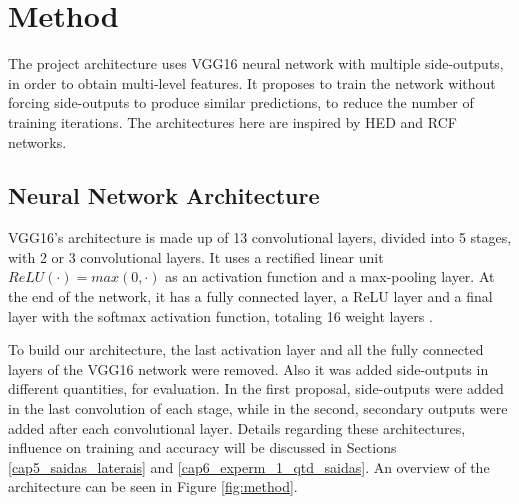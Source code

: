 \section{Method}
\label{cap5_metodologia}

The project architecture uses VGG16 neural network with multiple side-outputs, in order to obtain multi-level features.
It proposes to train the network without forcing side-outputs to produce similar predictions, to reduce the number of training iterations.
The architectures here are inspired by HED \cite{HED:2015} and RCF \cite{RCF:2017:8100105} networks.

\subsection{Neural Network Architecture}
\label{cap5_rede_neural}

VGG16's architecture is made up of 13 convolutional layers, divided into 5 stages, with 2 or 3 convolutional layers.
It uses a rectified linear unit $ReLU(\cdot) = max(0, \cdot)$ as an activation function and a max-pooling layer.
At the end of the network, it has a fully connected layer, a ReLU layer and a final layer with the softmax activation function, totaling 16 weight layers \cite{VGGNET:2014}.


To build our architecture, the last activation layer and all the fully connected layers of the VGG16 network were removed.
Also it was added side-outputs in different quantities, for evaluation.
In the first proposal, side-outputs were added in the last convolution of each stage, while in the second, secondary outputs were added after each convolutional layer.
Details regarding these architectures, influence on training and accuracy will be discussed in Sections \ref{cap5_saidas_laterais} and \ref{cap6_experm_1_qtd_saidas}.
An overview of the architecture can be seen in Figure \ref{fig:method}.

